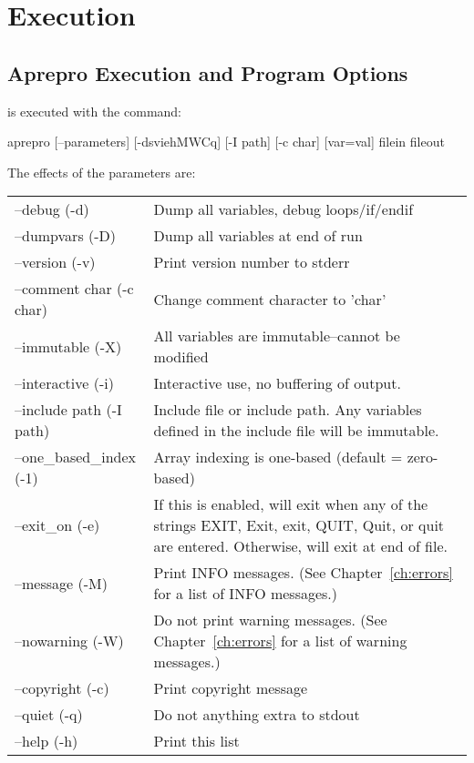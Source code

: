 \chapter{Execution}\label{ch:execution}

\section{Aprepro Execution and Program Options}
\aprepro{} is executed with the command:
\begin{apinp}
aprepro [--parameters] [-dsviehMWCq] [-I path] [-c char] [var=val] filein fileout
\end{apinp}

The effects of the parameters are:
\begin{longtable}{lp{5.0in}}
--debug (-d) &  Dump all variables, debug loops/if/endif \\
--dumpvars (-D) & Dump all variables at end of run \\
--version (-v) &  Print version number to stderr           \\
--comment char (-c char) &  Change comment character to 'char'       \\
--immutable (-X) &  All variables are immutable--cannot be modified \\
--interactive (-i) &  Interactive use, no buffering of output.       \\
--include path (-I path) &  Include file or include path. Any variables defined in the include file will be immutable.\\
--one\_based\_index (-1) & Array indexing is one-based (default = zero-based) \\
--exit\_on (-e) &  If this is enabled, \aprepro{} will exit when any of the strings 
EXIT, Exit, exit, QUIT, Quit, or quit are entered. Otherwise, \aprepro{} will exit at end of 
file. \\
--message (-M) &  Print INFO messages. (See Chapter~\ref{ch:errors} for a list of INFO messages.) \\
--nowarning (-W) &  Do not print warning messages. (See Chapter~\ref{ch:errors} for a list of warning messages.) \\
--copyright (-c) &  Print copyright message                  \\
--quiet (-q) &  Do not anything extra to stdout          \\
--help (-h) &  Print this list                          \\


\end{longtable}

